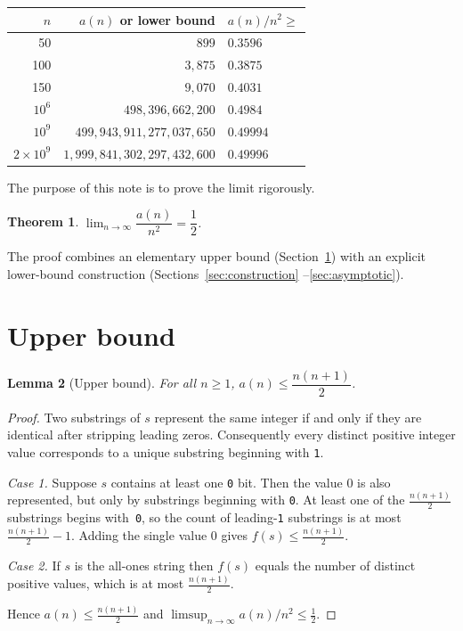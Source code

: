 \documentclass[12pt,a4paper]{article}
\theoremstyle{plain}
\newtheorem{theorem}{Theorem}
\newtheorem{lemma}[theorem]{Lemma}
\theoremstyle{definition}
\theoremstyle{remark}
\begin{document}
\begin{center}
\begin{tabular}{rrl}
  \toprule
  $n$ & $a(n)$ or lower bound & $a(n)/n^2 \ge$ \\
  \midrule
  50            & $899$                               & $0.3596$ \\
  100           & $3{,}875$                           & $0.3875$ \\
  150           & $9{,}070$                           & $0.4031$ \\
  $10^6$        & $498{,}396{,}662{,}200$             & $0.4984$ \\
  $10^9$        & $499{,}943{,}911{,}277{,}037{,}650$ & $0.49994$ \\
  $2\times10^9$ & $1{,}999{,}841{,}302{,}297{,}432{,}600$ & $0.49996$ \\
  \bottomrule
\end{tabular}
\end{center}

\noindent
The purpose of this note is to prove the limit rigorously.

\begin{theorem}\label{thm:main}
  $\displaystyle\lim_{n \to \infty} \dfrac{a(n)}{n^2} = \dfrac{1}{2}$.
\end{theorem}

The proof combines an elementary upper bound (Section~\ref{sec:upper})
with an explicit lower-bound construction (Sections~\ref{sec:construction}
--\ref{sec:asymptotic}).

\section{Upper bound}\label{sec:upper}

\begin{lemma}[Upper bound]\label{lem:upper}
  For all $n \ge 1$, $a(n) \le \dfrac{n(n+1)}{2}$.
\end{lemma}

\begin{proof}
  Two substrings of $s$ represent the same integer if and only if they
  are identical after stripping leading zeros.  Consequently every
  distinct positive integer value corresponds to a unique substring
  beginning with \texttt{1}.

  \emph{Case 1.}  Suppose $s$ contains at least one \texttt{0} bit.
  Then the value $0$ is also represented, but only by substrings beginning
  with \texttt{0}.  At least one of the $\frac{n(n+1)}{2}$ substrings
  begins with~\texttt{0}, so the count of leading-\texttt{1} substrings
  is at most $\frac{n(n+1)}{2} - 1$.  Adding the single value $0$ gives
  $f(s) \le \frac{n(n+1)}{2}$.

  \emph{Case 2.}  If $s$ is the all-ones string then $f(s)$ equals the
  number of distinct positive values, which is at most $\frac{n(n+1)}{2}$.

  Hence $a(n) \le \frac{n(n+1)}{2}$ and $\limsup_{n\to\infty}
  a(n)/n^2 \le \frac{1}{2}$.
\end{proof}
\end{document}
